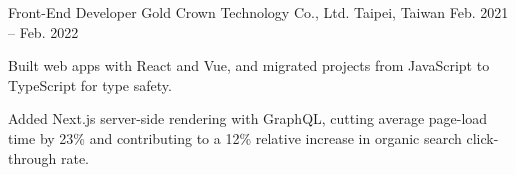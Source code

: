 \resumeExperience
  {Front-End Developer}
  {Gold Crown Technology Co., Ltd.}
  {Taipei, Taiwan}
  {Feb. 2021 -- Feb. 2022}
  {
    \item Built web apps with React and Vue, and migrated projects from JavaScript to TypeScript for type safety.
    \item Added Next.js server-side rendering with GraphQL, cutting average page-load time by 23\% and contributing to a 12\% relative increase in organic search click-through rate.
  }
